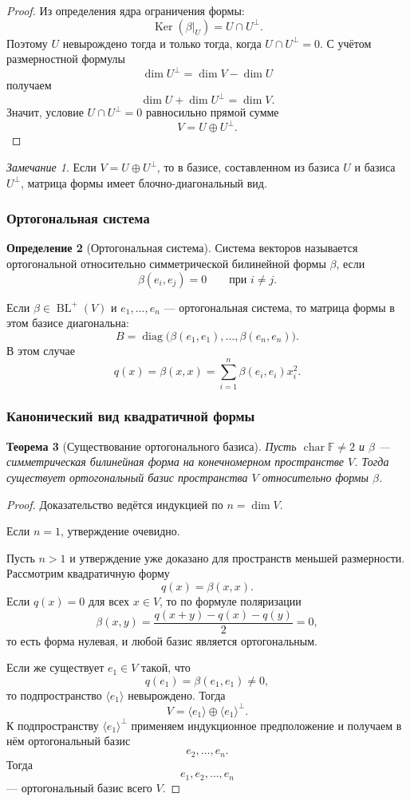 \documentclass[12pt,a4paper]{article}
\theoremstyle{definition}
\newtheorem{definition}{Определение}[section]
\theoremstyle{plain}
\newtheorem{theorem}[definition]{Теорема}
\theoremstyle{remark}
\newtheorem{remark}[definition]{Замечание}
\newcommand{\F}{\mathbb{F}}
\newcommand{\BL}{\operatorname{BL}}
\newcommand{\Ker}{\operatorname{Ker}}
\newcommand{\diag}{\operatorname{diag}}
\begin{document}
\begin{proof}
Из определения ядра ограничения формы:
\[
    \Ker(\beta|_U)=U\cap U^\perp.
\]
Поэтому $U$ невырождено тогда и только тогда, когда $U\cap U^\perp=0$.
С учётом размерностной формулы
\[
    \dim U^\perp=\dim V-\dim U
\]
получаем
\[
    \dim U+\dim U^\perp=\dim V.
\]
Значит, условие $U\cap U^\perp=0$ равносильно прямой сумме
\[
    V=U\oplus U^\perp.
\]
\end{proof}

\begin{remark}
Если $V=U\oplus U^\perp$, то в базисе, составленном из базиса $U$ и базиса $U^\perp$, матрица формы имеет блочно-диагональный вид.
\end{remark}

\subsubsection*{Ортогональная система}

\begin{definition}[Ортогональная система]
Система векторов называется ортогональной относительно симметрической билинейной формы $\beta$, если
\[
    \beta(e_i,e_j)=0
    \qquad \text{при } i\ne j.
\]
\end{definition}

Если $\beta\in\BL^+(V)$ и $e_1,
\ldots,e_n$ --- ортогональная система, то матрица формы в этом базисе диагональна:
\[
    B=\diag\bigl(\beta(e_1,e_1),\ldots,\beta(e_n,e_n)\bigr).
\]
В этом случае
\[
    q(x)=\beta(x,x)=\sum_{i=1}^n \beta(e_i,e_i)x_i^2.
\]

\subsubsection{Канонический вид квадратичной формы}


\begin{theorem}[Существование ортогонального базиса]
Пусть $\operatorname{char}\F\ne2$ и $\beta$ --- симметрическая билинейная форма на конечномерном пространстве $V$.
Тогда существует ортогональный базис пространства $V$ относительно формы $\beta$.
\end{theorem}

\begin{proof}
Доказательство ведётся индукцией по $n=\dim V$.

Если $n=1$, утверждение очевидно.

Пусть $n>1$ и утверждение уже доказано для пространств меньшей размерности.
Рассмотрим квадратичную форму
\[
    q(x)=\beta(x,x).
\]
Если $q(x)=0$ для всех $x\in V$, то по формуле поляризации
\[
    \beta(x,y)=\frac{q(x+y)-q(x)-q(y)}{2}=0,
\]
то есть форма нулевая, и любой базис является ортогональным.

Если же существует $e_1\in V$ такой, что
\[
    q(e_1)=\beta(e_1,e_1)\ne0,
\]
то подпространство $\langle e_1\rangle$ невырождено. Тогда
\[
    V=\langle e_1\rangle\oplus \langle e_1\rangle^\perp.
\]
К подпространству $\langle e_1\rangle^\perp$ применяем индукционное предположение и получаем в нём ортогональный базис
\[
    e_2,\ldots,e_n.
\]
Тогда
\[
    e_1,e_2,\ldots,e_n
\]
--- ортогональный базис всего $V$.
\end{proof}
\end{document}
